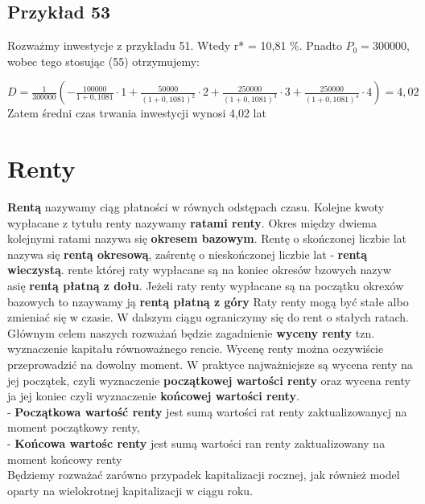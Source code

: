 \documentclass{article}
\begin{document}
\subsection{Przykład 53}

Rozważmy inwestycje z przykładu 51. Wtedy r* = 10,81 \%. Pnadto $ P_0 = 300000 $, wobec tego stosując (55) otrzymujemy:

$ D = \frac{1}{300000} (-\frac{100000}{1 + 0,1081} \cdot 1 + \frac{50000}{(1 + 0,1081)^2} \cdot 2 + \frac{250000}{(1 + 0,1081)^3} \cdot 3 + \frac{250000}{(1 + 0,1081)^4} \cdot 4) = 4,02 $\\

Zatem średni czas trwania inwestycji wynosi 4,02 lat\\

\newpage

\section{Renty}

\textbf{Rentą} nazywamy ciąg płatności w równych odstępach czasu. Kolejne kwoty wypłacane z tytułu renty nazywamy \textbf{ratami renty}. Okres między dwiema kolejnymi ratami nazywa się \textbf{okresem bazowym}. Rentę o skończonej liczbie lat nazywa się \textbf{rentą okresową}, zaśrentę o nieskończonej liczbie lat - \textbf{rentą wieczystą}. rente której raty wypłacane są na koniec okresów bzowych nazyw asię \textbf{rentą płatną z dołu}. Jeżeli raty renty wypłacane są na początku okrexów bazowych to nzaywamy ją \textbf{rentą płatną z góry} Raty renty mogą być stałe albo zmieniać się w czasie. W dalszym ciągu ograniczymy się do rent o stałych ratach. Głównym celem naszych rozważań będzie zagadnienie \textbf{wyceny renty} tzn. wyznaczenie kapitału równoważnego rencie. Wycenę renty można oczywiście przeprowadzić na dowolny moment. W praktyce najważniejsze są wycena renty na jej początek, czyli wyznaczenie \textbf{początkowej wartości renty} oraz wycena renty ja jej koniec czyli wyznaczenie \textbf{końcowej wartości renty}.\\

- \textbf{Początkowa wartość renty} jest sumą wartości rat renty zaktualizowanycj na moment początkowy renty, \\

- \textbf{Końcowa wartośc renty} jest sumą wartości ran renty zaktualizowany na moment końcowy renty\\

Będziemy rozważać zarówno przypadek kapitalizacji rocznej, jak również model oparty na wielokrotnej kapitalizacji w ciągu roku.
\end{document}
